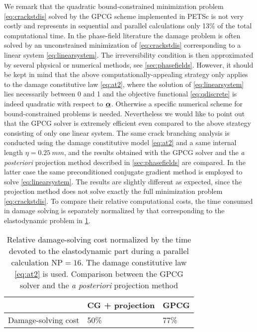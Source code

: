 We remark that the quadratic bound-constrained minimization problem \eqref{eq:crackstdis} solved by the GPCG scheme implemented in PETSc is not very costly and represents in sequential and parallel calculations only 13\% of the total computational time. In the phase-field literature the damage problem is often solved by an unconstrained minimization of \eqref{eq:crackstdis} corresponding to a linear system \eqref{eq:linearsystem}. The irreversibility condition is then approximated by several physical or numerical methods, see \cref{sec:phasefields}. However, it should be kept in mind that the above computationally-appealing strategy only applies to the damage constitutive law \eqref{eq:at2}, where the solution of \eqref{eq:linearsystem} lies necessarily between 0 and 1 and the objective functional \eqref{eq:qdiscrete} is indeed quadratic with respect to $\dvec$. Otherwise a specific numerical scheme for bound-constrained problems is needed. Nevertheless we would like to point out that the GPCG solver is extremely efficient even compared to the above strategy consisting of only one linear system. The same crack branching analysis is conducted using the damage constitutive model \eqref{eq:at2} and a same internal length $\eta=\SI{0.25}{mm}$, and the results obtained with the GPCG solver and the \emph{a posteriori} projection method described in \cref{sec:phasefields} are compared. In the latter case the same preconditioned conjugate gradient method is employed to solve \eqref{eq:linearsystem}. The results are slightly different as expected, since the projection method does not solve exactly the full minimization problem \eqref{eq:crackstdis}. To compare their relative computational costs, the time consumed in damage solving is separately normalized by that corresponding to the elastodynamic problem in \cref{tab:gpcg_vs_cg_proj}.
\begin{table}[htbp]
\centering
\caption{Relative damage-solving cost normalized by the time devoted to the elastodynamic part during a parallel calculation $\mathrm{NP}=16$. The damage constitutive law \eqref{eq:at2} is used. Comparison between the GPCG solver and the \emph{a posteriori} projection method} \label{tab:gpcg_vs_cg_proj}
\begin{tabular}{lll} \toprule
&  CG + projection & GPCG \\ \midrule
Damage-solving cost & 50\% & 77\% \\ \bottomrule
\end{tabular}
\end{table}

